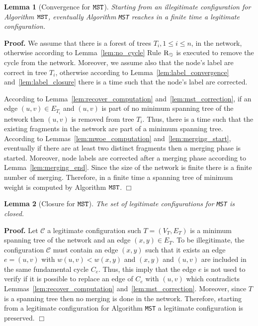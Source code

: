 \documentclass[11pt,a4paper]{article}
\newtheorem{lemma}{Lemma}
\newenvironment{proof}{\noindent \begin{rm}{\textbf{Proof.} }}{\hspace*{\fill}$\Box$\par\end{rm}}
\newcommand{\RRoot}{\mbox{\rm R$_{\odot}$}} 	\newcommand{\RRLC}{\mbox{\rm R$_{\ell_{\odot}}$}}\newcommand{\RLC}{\mbox{\rm R$_{\ell}$}} \newcommand{\RMin}{\mbox{\rm R$_{Min}$}}
\newcommand{\MST}{\mbox{\tt MST}}
\begin{document}
\begin{lemma}[Convergence for $\MST$]
\label{lem:mst_convergence}
Starting from an illegitimate configuration for Algorithm $\MST$, eventually Algorithm \MST\/ reaches in a finite time a legitimate configuration.
\end{lemma}

\begin{proof}
We assume that there is a forest of trees $T_i, 1 \leq i \leq n$, in the network, otherwise according to Lemma~\ref{lem:no_cycle} Rule $\RRoot$ is executed to remove the cycle from the network. Moreover, we assume also that the node's label are correct in tree $T_i$, otherwise according to Lemma~\ref{lem:label_convergence} and~\ref{lem:label_closure} there is a time such that the node's label are corrected.

According to Lemma~\ref{lem:recover_computation} and~\ref{lem:mst_correction}, if an edge $(u,v) \in E_{T_i}$ and $(u,v)$ is part of no minimum spanning tree of the network then $(u,v)$ is removed from tree $T_i$. Thus, there is a time such that the existing fragments in the network are part of a minimum spanning tree. According to Lemmas~\ref{lem:mwoe_computation} and~\ref{lem:merging_start}, eventually if there are at least two distinct fragments then a merging phase is started. Moreover, node labels are corrected after a merging phase according to Lemma~\ref{lem:merging_end}. Since the size of the network is finite there is a finite number of merging. Therefore, in a finite time a spanning tree of minimum weight is computed by Algorithm $\MST$.
\end{proof}

\begin{lemma}[Closure for $\MST$]
\label{lem:mst_closure}
The set of legitimate configurations for \MST\/ is closed.
\end{lemma}

\begin{proof}
Let $\mathcal{C}$ a legitimate configuration such $T=(V_T,E_T)$ is a minimum spanning tree of the network and an edge $(x,y) \in E_T$. To be illegitimate, the configuration $\mathcal{C}$ must contain an edge $(x,y)$ such that it exists an edge $e=(u,v)$ with $w(u,v)<w(x,y)$ and $(x,y)$ and $(u,v)$ are included in the same fundamental cycle $C_e$. Thus, this imply that the edge $e$ is not used to verify if it is possible to replace an edge of $C_e$ with $(u,v)$ which contradicts Lemmas~\ref{lem:recover_computation} and~\ref{lem:mst_correction}. Moreover, since $T$ is a spanning tree then no merging is done in the network. Therefore, starting from a legitimate configuration for Algorithm \MST\/ a legitimate configuration is preserved.
\end{proof}
\end{document}
